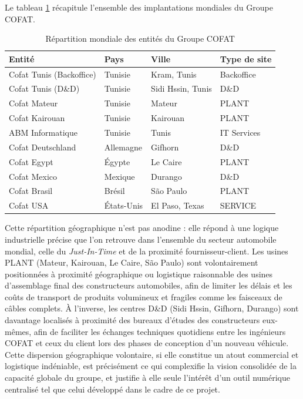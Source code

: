 Le tableau \ref{tab:cofat_sites} récapitule l'ensemble des implantations mondiales du Groupe COFAT.

\begin{table}[h]
\centering
\begin{tabular}{|l|l|l|l|}
\hline
\textbf{Entité} & \textbf{Pays} & \textbf{Ville} & \textbf{Type de site} \\ \hline
Cofat Tunis (Backoffice) & Tunisie & Kram, Tunis & Backoffice \\ \hline
Cofat Tunis (D\&D) & Tunisie & Sidi Hssin, Tunis & D\&D \\ \hline
Cofat Mateur & Tunisie & Mateur & PLANT \\ \hline
Cofat Kairouan & Tunisie & Kairouan & PLANT \\ \hline
ABM Informatique & Tunisie & Tunis & IT Services \\ \hline
Cofat Deutschland & Allemagne & Gifhorn & D\&D \\ \hline
Cofat Egypt & Égypte & Le Caire & PLANT \\ \hline
Cofat Mexico & Mexique & Durango & D\&D \\ \hline
Cofat Brasil & Brésil & São Paulo & PLANT \\ \hline
Cofat USA & États-Unis & El Paso, Texas & SERVICE \\ \hline
\end{tabular}
\caption{Répartition mondiale des entités du Groupe COFAT}
\label{tab:cofat_sites}
\end{table}

Cette répartition géographique n'est pas anodine : elle répond à une logique industrielle précise que l'on retrouve dans l'ensemble du secteur automobile mondial, celle du \textit{Just-In-Time} et de la proximité fournisseur-client. Les usines PLANT (Mateur, Kairouan, Le Caire, São Paulo) sont volontairement positionnées à proximité géographique ou logistique raisonnable des usines d'assemblage final des constructeurs automobiles, afin de limiter les délais et les coûts de transport de produits volumineux et fragiles comme les faisceaux de câbles complets. À l'inverse, les centres D\&D (Sidi Hssin, Gifhorn, Durango) sont davantage localisés à proximité des bureaux d'études des constructeurs eux-mêmes, afin de faciliter les échanges techniques quotidiens entre les ingénieurs COFAT et ceux du client lors des phases de conception d'un nouveau véhicule. Cette dispersion géographique volontaire, si elle constitue un atout commercial et logistique indéniable, est précisément ce qui complexifie la vision consolidée de la capacité globale du groupe, et justifie à elle seule l'intérêt d'un outil numérique centralisé tel que celui développé dans le cadre de ce projet.

